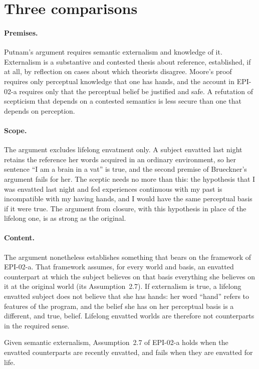 \documentclass{situationist-preprint}
\begin{document}
\section{Three comparisons}

\paragraph{Premises.} Putnam's argument requires semantic externalism and knowledge of it. Externalism is a substantive and contested thesis about reference, established, if at all, by reflection on cases about which theorists disagree. Moore's proof requires only perceptual knowledge that one has hands, and the account in EPI-02-a requires only that the perceptual belief be justified and safe. A refutation of scepticism that depends on a contested semantics is less secure than one that depends on perception.

\paragraph{Scope.} The argument excludes lifelong envatment only. A subject envatted last night retains the reference her words acquired in an ordinary environment, so her sentence \enquote{I am a brain in a vat} is true, and the second premise of Brueckner's argument fails for her. The sceptic needs no more than this: the hypothesis that I was envatted last night and fed experiences continuous with my past is incompatible with my having hands, and I would have the same perceptual basis if it were true. The argument from closure, with this hypothesis in place of the lifelong one, is as strong as the original.

\paragraph{Content.} The argument nonetheless establishes something that bears on the framework of EPI-02-a. That framework assumes, for every world and basis, an envatted counterpart at which the subject believes on that basis everything she believes on it at the original world (its Assumption~2.7). If externalism is true, a lifelong envatted subject does not believe that she has hands: her word \enquote{hand} refers to features of the program, and the belief she has on her perceptual basis is a different, and true, belief. Lifelong envatted worlds are therefore not counterparts in the required sense.

\begin{proposition}\label{p:counterpart}
Given semantic externalism, Assumption~2.7 of EPI-02-a holds when the envatted counterparts are recently envatted, and fails when they are envatted for life.
\end{proposition}
\end{document}
